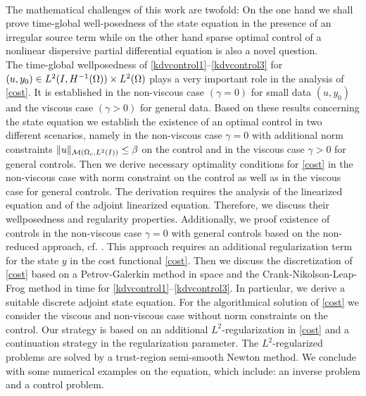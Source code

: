 \\
The mathematical challenges of this work are twofold: On the one hand we shall prove time-global well-posedness of the state equation in the presence of an irregular source term while on the other hand sparse optimal control of a nonlinear dispersive partial differential equation is also a novel question.\\
{\color{red} The time-global wellposedness of \eqref{kdvcontrol1}--\eqref{kdvcontrol3} for $(u,y_0)\in \Hm1\times L^2(\Omega)$ plays a very important role in the analysis of \eqref{cost}. It is established in the non-viscous case $(\gamma=0)$ for small data $(u,y_0)$ and the viscous case $(\gamma>0)$ for general data. Based on these results concerning the state equation we establish the existence of an optimal control in two different scenarios, namely in the non-viscous case $\gamma=0$ with additional norm constraints $\|u\|_{\mathcal{M}(\Omega_c, L^{2}(I))}\leq \beta$ on the control and in the viscous case $\gamma>0$ for general controls. Then we derive necessary optimality conditions for \eqref{cost} in the non-viscous case with norm constraint on the control as well as in the viscous case for general controls. The derivation requires the analysis of the linearized \KdVB equation and of the adjoint linearized \KdVB equation. Therefore, we discuss their wellposedness and regularity properties.  Additionally, we proof existence of controls in the non-viscous case $\gamma=0$ with general controls based on the non-reduced approach, cf. \cite{lions1985control}. This approach requires an additional regularization term for the state $y$ in the cost functional \eqref{cost}. Then we discuss the discretization of \eqref{cost} based on a Petrov-Galerkin method in space and the Crank-Nikolson-Leap-Frog method in time for \eqref{kdvcontrol1}--\eqref{kdvcontrol3}. In particular, we derive a suitable discrete adjoint state equation. For the algorithmical solution of \eqref{cost} we consider the viscous and non-viscous case without norm constraints on the control. Our strategy is based on an additional $L^2$-regularization in \eqref{cost} and a continuation strategy in the regularization parameter. The $L^2$-regularized problems are solved by a trust-region semi-smooth Newton method. We conclude with some numerical examples on the \KdVB equation, which include: an inverse problem and a control problem.}

